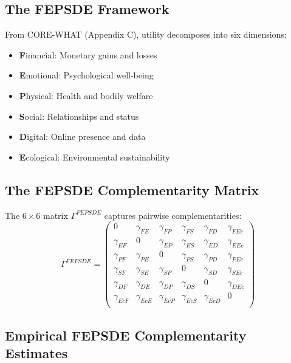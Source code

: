 \subsection{The FEPSDE Framework}

From CORE-WHAT (Appendix C), utility decomposes into six dimensions:
\begin{itemize}[noitemsep]
    \item \textbf{F}inancial: Monetary gains and losses
    \item \textbf{E}motional: Psychological well-being
    \item \textbf{P}hysical: Health and bodily welfare
    \item \textbf{S}ocial: Relationships and status
    \item \textbf{D}igital: Online presence and data
    \item \textbf{E}cological: Environmental sustainability
\end{itemize}

\subsection{The FEPSDE Complementarity Matrix}

\begin{definition}
The $6 \times 6$ matrix $\Gamma^{FEPSDE}$ captures pairwise complementarities:
\begin{equation}
\Gamma^{FEPSDE} = \begin{pmatrix}
0 & \gamma_{FE} & \gamma_{FP} & \gamma_{FS} & \gamma_{FD} & \gamma_{FEc} \\
\gamma_{EF} & 0 & \gamma_{EP} & \gamma_{ES} & \gamma_{ED} & \gamma_{EEc} \\
\gamma_{PF} & \gamma_{PE} & 0 & \gamma_{PS} & \gamma_{PD} & \gamma_{PEc} \\
\gamma_{SF} & \gamma_{SE} & \gamma_{SP} & 0 & \gamma_{SD} & \gamma_{SEc} \\
\gamma_{DF} & \gamma_{DE} & \gamma_{DP} & \gamma_{DS} & 0 & \gamma_{DEc} \\
\gamma_{EcF} & \gamma_{EcE} & \gamma_{EcP} & \gamma_{EcS} & \gamma_{EcD} & 0 \\
\end{pmatrix}
\end{equation}
\end{definition}

\subsection{Empirical FEPSDE Complementarity Estimates}


